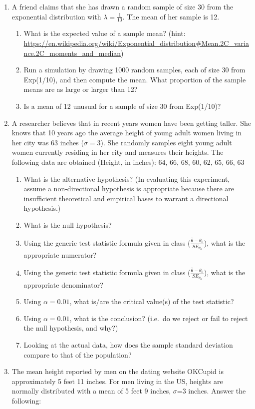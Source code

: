 \documentclass[]{article}
\providecommand{\tightlist}{%
  \setlength{\itemsep}{0pt}\setlength{\parskip}{0pt}}
\begin{document}
\begin{enumerate}
\def\labelenumi{\arabic{enumi}.}
\setcounter{enumi}{1}
\item
  A friend claims that she has drawn a random sample of size 30 from the
  exponential distribution with \(\lambda = \frac{1}{10}\). The mean of
  her sample is 12.

  \begin{enumerate}
  \def\labelenumii{\alph{enumii}.}
  \tightlist
  \item
    What is the expected value of a sample mean? (hint:
    \url{https://en.wikipedia.org/wiki/Exponential_distribution\#Mean.2C_variance.2C_moments_and_median})
  \item
    Run a simulation by drawing 1000 random samples, each of size 30
    from Exp(1/10), and then compute the mean. What proportion of the
    sample means are as large or larger than 12?
  \item
    Is a mean of 12 unusual for a sample of size 30 from Exp(1/10)?
  \end{enumerate}
\item
  A researcher believes that in recent years women have been getting
  taller. She knows that 10 years ago the average height of young adult
  women living in her city was 63 inches (\(\sigma = 3\)). She randomly
  samples eight young adult women currently residing in her city and
  measures their heights. The following data are obtained (Height, in
  inches): 64, 66, 68, 60, 62, 65, 66, 63

  \begin{enumerate}
  \def\labelenumii{\alph{enumii}.}
  \tightlist
  \item
    What is the alternative hypothesis? (In evaluating this experiment,
    assume a non-directional hypothesis is appropriate because there are
    insufficient theoretical and empirical bases to warrant a
    directional hypothesis.)
  \item
    What is the null hypothesis?
  \item
    Using the generic test statistic formula given in class
    (\(\frac{\hat{\theta}-{\theta_0}}{SE_{\theta_0}}\)), what is the
    appropriate numerator?
  \item
    Using the generic test statistic formula given in class
    (\(\frac{\hat{\theta}-{\theta_0}}{SE_{\theta_0}}\)), what is the
    appropriate denominator?
  \item
    Using \(\alpha = 0.01\), what is/are the critical value(s) of the
    test statistic?
  \item
    Using \(\alpha = 0.01\), what is the conclusion? (i.e.~do we reject
    or fail to reject the null hypothesis, and why?)
  \item
    Looking at the actual data, how does the sample standard deviation
    compare to that of the population?
  \end{enumerate}
\item
  The mean height reported by men on the dating website OKCupid is
  approximately 5 feet 11 inches. For men living in the US, heights are
  normally distributed with a mean of 5 feet 9 inches, \(\sigma\)=3
  inches. Answer the following:


\end{enumerate}
\end{document}
